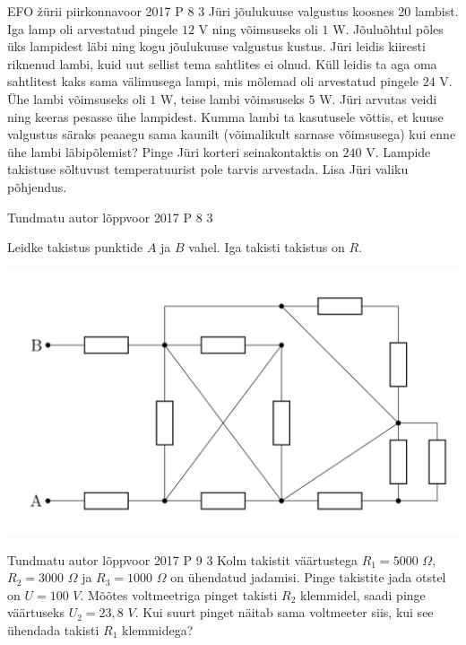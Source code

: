 \documentclass[11pt]{article}
\begin{document}
{%
{EFO žürii} %
{piirkonnavoor} %
{2017} %
{P 8} %
{3} %
{
\ifStatement
Jüri jõulukuuse valgustus koosnes 20 lambist. Iga lamp oli arvestatud pingele $12$ V ning võimsuseks oli $1$ W. Jõuluõhtul põles üks lampidest läbi ning kogu jõulukuuse valgustus kustus. Jüri leidis kiiresti riknenud lambi, kuid uut sellist tema sahtlites ei olnud. Küll leidis ta aga oma sahtlitest kaks sama välimusega lampi, mis mõlemad oli arvestatud pingele $24$ V. Ühe lambi võimsuseks oli $1$ W, teise lambi võimsuseks $5$ W. Jüri arvutas veidi ning keeras pesasse ühe lampidest. Kumma lambi ta kasutusele võttis, et kuuse valgustus säraks peaaegu sama kaunilt (võimalikult sarnase võimsusega) kui enne ühe lambi läbipõlemist? Pinge Jüri korteri seinakontaktis on $240$ V. Lampide takistuse sõltuvust temperatuurist pole tarvis arvestada. Lisa Jüri valiku põhjendus.
\fi
}

{Tundmatu autor} %
{lõppvoor} %
{2017} %
{P 8} %
{3} %
{
\ifStatement
Leidke takistus punktide $A$ ja $B$ vahel. Iga takisti takistus on $R$.
\begin{center}
	\includegraphics[width=0.5\linewidth]{2017-v3p-08-yl.png}
\end{center}
\fi
}

{Tundmatu autor} %
{lõppvoor} %
{2017} %
{P 9} %
{3} %
{
\ifStatement
Kolm takistit väärtustega $R_1 = 5000$ $\Omega$, $R_2 = 3000$ $\Omega$ ja $R_3 = 1000$ $\Omega$ on ühendatud jadamisi. Pinge takistite jada otstel on $U = 100$ $V$. Mõõtes voltmeetriga pinget takisti $R_2$ klemmidel, saadi pinge väärtuseks $U_2 = 23,8$ $V$. Kui suurt pinget näitab sama voltmeeter siis, kui see ühendada takisti $R_1$ klemmidega?
\fi
}

}
\end{document}
